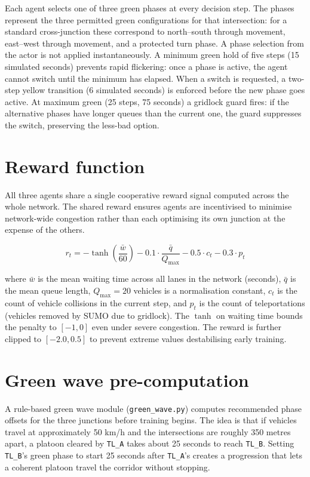 \documentclass[11pt, a4paper]{report}
\begin{document}
Each agent selects one of three green phases at every decision step. The phases represent the three permitted green configurations for that intersection: for a standard cross-junction these correspond to north--south through movement, east--west through movement, and a protected turn phase. A phase selection from the actor is not applied instantaneously. A minimum green hold of five steps (15 simulated seconds) prevents rapid flickering: once a phase is active, the agent cannot switch until the minimum has elapsed. When a switch is requested, a two-step yellow transition (6 simulated seconds) is enforced before the new phase goes active. At maximum green (25 steps, 75 seconds) a gridlock guard fires: if the alternative phases have longer queues than the current one, the guard suppresses the switch, preserving the less-bad option.

\section{Reward function}

All three agents share a single cooperative reward signal computed across the whole network. The shared reward ensures agents are incentivised to minimise network-wide congestion rather than each optimising its own junction at the expense of the others.

\begin{equation}
r_t = -\tanh\!\left(\frac{\bar{w}}{60}\right) - 0.1 \cdot \frac{\bar{q}}{Q_{\max}} - 0.5 \cdot c_t - 0.3 \cdot p_t
\label{eq:reward}
\end{equation}

where $\bar{w}$ is the mean waiting time across all lanes in the network (seconds), $\bar{q}$ is the mean queue length, $Q_{\max} = 20$ vehicles is a normalisation constant, $c_t$ is the count of vehicle collisions in the current step, and $p_t$ is the count of teleportations (vehicles removed by SUMO due to gridlock). The $\tanh$ on waiting time bounds the penalty to $[-1, 0]$ even under severe congestion. The reward is further clipped to $[-2.0, 0.5]$ to prevent extreme values destabilising early training.

\section{Green wave pre-computation}

A rule-based green wave module (\texttt{green\_wave.py}) computes recommended phase offsets for the three junctions before training begins. The idea is that if vehicles travel at approximately 50 km/h and the intersections are roughly 350 metres apart, a platoon cleared by \texttt{TL\_A} takes about 25 seconds to reach \texttt{TL\_B}. Setting \texttt{TL\_B}'s green phase to start 25 seconds after \texttt{TL\_A}'s creates a progression that lets a coherent platoon travel the corridor without stopping.
\end{document}
